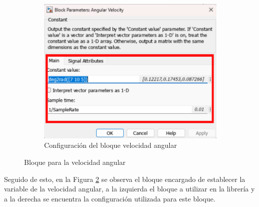 \begin{figure}[htbp]
\begin{subfigure}[b]{0.45\textwidth}
        \includegraphics[width=\textwidth]{fig/Capitulo5/Caso_de_estudio_IMU/Generador_de_archivos/configuracion_bloque_velocidad_angular.pdf}
        \caption{Configuración del bloque velocidad angular}
        \label{fig:lib_bloques_config_angular_velocity}
    \end{subfigure}
    \caption{Bloque para la velocidad angular}
    \label{fig:angular_velocity_block_simulink}
\end{figure}

Seguido de esto, en la Figura \ref{fig:angular_velocity_block_simulink} se observa el bloque encargado de establecer la variable de la velocidad angular, a la izquierda el bloque a utilizar en la librería y a la derecha se encuentra la configuración utilizada para este bloque. 

\newpage

